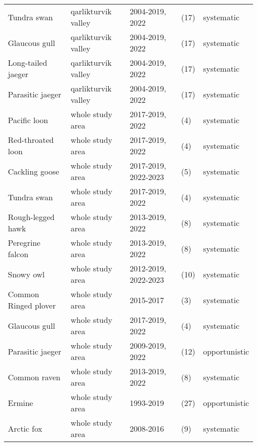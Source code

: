 \begin{table}[ht]
\begin{tabularx}{\textwidth}{lllll}
  Tundra swan & qarlikturvik valley & 2004-2019, 2022 & (17) & systematic \\ 
  Glaucous gull & qarlikturvik valley & 2004-2019, 2022 & (17) & systematic \\ 
  Long-tailed jaeger & qarlikturvik valley & 2004-2019, 2022 & (17) & systematic \\ 
  Parasitic jaeger & qarlikturvik valley & 2004-2019, 2022 & (17) & systematic \\ 
  Pacific loon & whole study area & 2017-2019, 2022 & (4) & systematic \\ 
  Red-throated loon & whole study area & 2017-2019, 2022 & (4) & systematic \\ 
  Cackling goose & whole study area & 2017-2019, 2022-2023 & (5) & systematic \\ 
  Tundra swan & whole study area & 2017-2019, 2022 & (4) & systematic \\ 
  Rough-legged hawk & whole study area & 2013-2019, 2022 & (8) & systematic \\ 
  Peregrine falcon & whole study area & 2013-2019, 2022  & (8) & systematic \\ 
  Snowy owl & whole study area & 2012-2019, 2022-2023 & (10) & systematic \\ 
  Common Ringed plover & whole study area & 2015-2017 & (3) & systematic \\ 
  Glaucous gull & whole study area & 2017-2019, 2022 & (4) & systematic \\ 
  Parasitic jaeger & whole study area & 2009-2019, 2022 & (12) & opportunistic \\ 
  Common raven & whole study area & 2013-2019, 2022 & (8) & systematic \\ 
  Ermine & whole study area & 1993-2019 & (27) & opportunistic \\ 
  Arctic fox & whole study area & 2008-2016 & (9) & systematic \\ 
   \hline
\end{tabularx}
\endgroup
\end{table}
